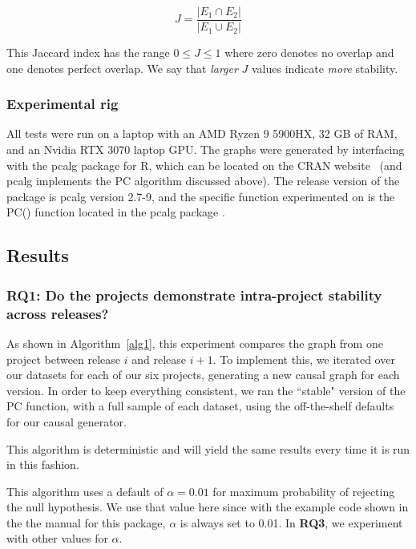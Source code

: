 \documentclass[]{svjour3}
\begin{document}
    \begin{equation}
    J=\frac{|E_1 \cap E_2|}{|E_1 \cup E_2|}
     \end{equation} 

     This Jaccard index has the range $0 \le J \le 1$ where zero denotes no overlap and one denotes perfect overlap. We say that {\em larger} $J$ values indicate {\em more} stability.


\subsubsection{Experimental rig}
  All tests were run on a laptop with an AMD Ryzen 9 5900HX, 32 GB of RAM, and an Nvidia RTX 3070 laptop GPU. The graphs were generated by interfacing with the pcalg package for R, which can be located on the CRAN website~\cite{PCALG1} (and pcalg implements the PC algorithm discussed above).  
  The release version of the package is pcalg version 2.7-9, and the specific function experimented on is the PC() function located in the pcalg package \cite{PCALG1}\cite{PCALG2}.


 
\subsection{Results}


\subsubsection{RQ1: Do the projects demonstrate intra-project stability across releases?}

As shown in Algorithm~\ref{alg1}, this experiment compares the graph from one project
between  release $i$ and release $i + 1$.   
 To implement this, we iterated over our datasets for each of our six projects, generating a new causal graph for each version.  In order to keep everything consistent, we ran the ``stable" version of the PC function, with a full sample of each dataset, using the off-the-shelf defaults for
 our causal generator.  
 
  This algorithm is deterministic and will yield the same results every time it is run in this fashion. 
  
  This algorithm uses a default of $\alpha=0.01$ for maximum probability of rejecting the null hypothesis. We use that value here since 
with the example code shown in the  the manual for this package,
$\alpha$ is always set  to 0.01. In 
{\bf RQ3}, we experiment
with other values for $\alpha$.
\end{document}
